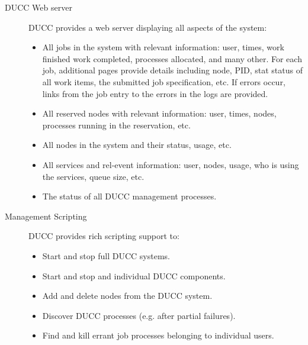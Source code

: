 \begin{description}
        \item[DUCC Web server] DUCC  provides a web server displaying all aspects of the system:
          \begin{itemize}
              \item All jobs in the system with relevant information: user, times, work finished work completed,
                processes allocated, and many other. For each job, additional pages provide details including
                node, PID, stat status of all work items, the submitted job specification, etc. If errors occur,
                links from the job entry to the errors in the logs are provided.
                
              \item All reserved nodes with relevant information: user, times, nodes, processes running in the
                reservation, etc.
                
              \item All nodes in the system and their status, usage, etc. 
                
              \item All services and rel-event information: user, nodes, usage, who is using the
                services, queue size, etc.
                
              \item The status of all DUCC management processes.  
          \end{itemize}


        \item[Management Scripting] DUCC provides rich scripting support to:
          \begin{itemize}
              \item Start and stop full DUCC systems.
 
              \item Start and stop and individual DUCC components.
 
              \item Add and delete nodes from the DUCC system.
 
              \item Discover DUCC processes (e.g. after partial failures).
 
              \item Find and kill errant job processes belonging to individual users.
          \end{itemize}
      \end{description}


